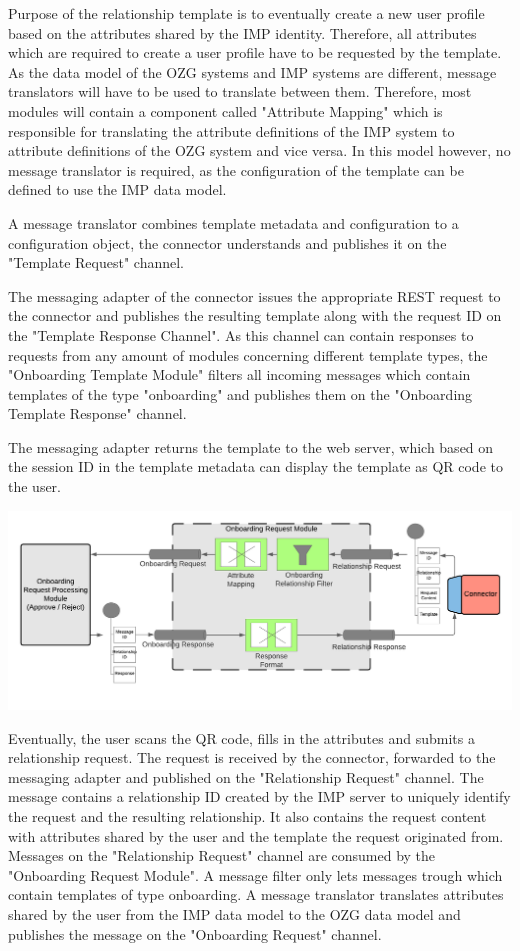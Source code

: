 Purpose of the relationship template is to eventually create a new user profile based on the attributes shared by the IMP identity. Therefore, all attributes which are required to create a user profile have to be requested by the template. As the data model of the OZG systems and IMP systems are different, message translators will have to be used to translate between them. Therefore, most modules will contain a component called "Attribute Mapping" which is responsible for translating the attribute definitions of the IMP system to attribute definitions of the OZG system and vice versa. In this model however, no message translator is required, as the configuration of the template can be defined to use the IMP data model.

A message translator combines template metadata and configuration to a configuration object, the connector understands and publishes it on the "Template Request" channel.

The messaging adapter of the connector issues the appropriate REST request to the connector and publishes the resulting template along with the request ID on the "Template Response Channel". As this channel can contain responses to requests from any amount of modules concerning different template types, the "Onboarding Template Module" filters all incoming messages which contain templates of the type "onboarding" and publishes them on the "Onboarding Template Response" channel.

The messaging adapter returns the template to the web server, which based on the session ID in the template metadata can display the template as QR code to the user.


\begin{center}
    \includegraphics[scale=0.6]{Diagrams/Integration Architecture 1/Technological Integration/7. Onboarding Request Module.pdf}
\end{center}

Eventually, the user scans the QR code, fills in the attributes and submits a relationship request. The request is received by the connector, forwarded to the messaging adapter and published on the "Relationship Request" channel. The message contains a relationship ID created by the IMP server to uniquely identify the request and the resulting relationship. It also contains the request content with attributes shared by the user and the template the request originated from. Messages on the "Relationship Request" channel are consumed by the "Onboarding Request Module". A message filter only lets messages trough which contain templates of type onboarding. A message translator translates attributes shared by the user from the IMP data model to the OZG data model and publishes the message on the "Onboarding Request" channel.

